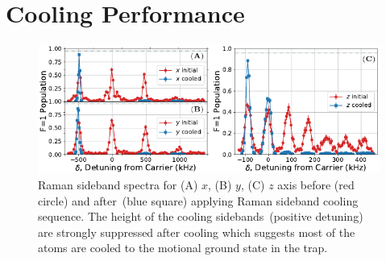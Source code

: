 \section{Cooling Performance}
\label{ch:rsc:performance}

\begin{figure}
  \centering
  \includegraphics[width=\textwidth]{figures/na_rsc_spectrum.pdf}
  \caption[Raman sideband spectra before and after cooling]{
    Raman sideband spectra for (A) $x$, (B) $y$, (C) $z$ axis before (red circle)
    and after~(blue square) applying Raman sideband cooling sequence.
    The height of the cooling sidebands~(positive detuning)
    are strongly suppressed after cooling which suggests most of the atoms are cooled
    to the motional ground state in the trap.
    \label{fig:rsc:na-spectrum}}
\end{figure}

